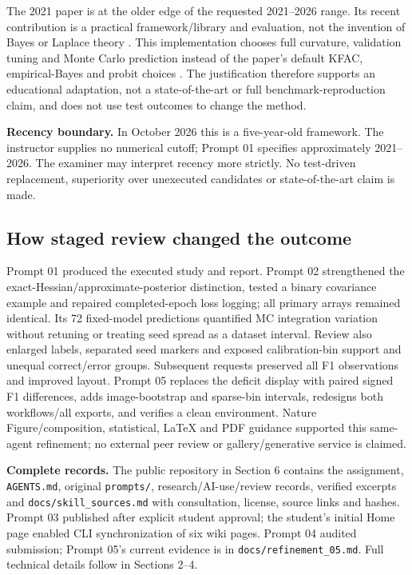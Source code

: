 \documentclass[10pt,a4paper]{article}
\begin{document}
The 2021 paper is at the older edge of the requested 2021--2026 range. Its recent
contribution is a practical framework/library and evaluation, not the invention
of Bayes or Laplace theory \cite{mackay}. This implementation chooses full
curvature, validation tuning and Monte Carlo prediction instead of the paper's
default KFAC, empirical-Bayes and probit choices \cite{laplace}. The justification
therefore supports an educational adaptation, not a state-of-the-art or full
benchmark-reproduction claim, and does not use test outcomes to change the method.


\textbf{Recency boundary.} In October 2026 this is a five-year-old framework.
The instructor supplies no numerical cutoff; Prompt 01 specifies approximately
2021--2026. The examiner may interpret recency more strictly. No test-driven
replacement, superiority over unexecuted candidates or state-of-the-art claim is made.

\subsection{How staged review changed the outcome}
Prompt 01 produced the executed study and report. Prompt 02 strengthened the
exact-Hessian/approximate-posterior distinction, tested a binary covariance
example and repaired completed-epoch loss logging; all primary arrays remained
identical. Its 72 fixed-model predictions quantified MC integration variation
without retuning or treating seed spread as a dataset interval.
Review also enlarged labels, separated seed markers and exposed calibration-bin
support and unequal correct/error groups. Subsequent requests preserved all F1
observations and improved layout. Prompt 05 replaces the deficit display with
paired signed F1 differences, adds image-bootstrap and sparse-bin intervals,
redesigns both workflows/all exports, and verifies a clean environment.
Nature Figure/composition, statistical, LaTeX and PDF guidance supported this
same-agent refinement; no external peer review or gallery/generative service is claimed.

\textbf{Complete records.} The public repository in Section 6 contains the
assignment, \texttt{AGENTS.md}, original \texttt{prompts/}, research/AI-use/review
records, verified excerpts and \texttt{docs/skill\_sources.md} with consultation,
license, source links and hashes. Prompt 03 published after explicit student
approval; the student's initial Home page enabled CLI synchronization of six
wiki pages. Prompt 04 audited submission; Prompt 05's current evidence is in
\texttt{docs/refinement\_05.md}. Full technical details follow in Sections 2--4.
\end{document}
